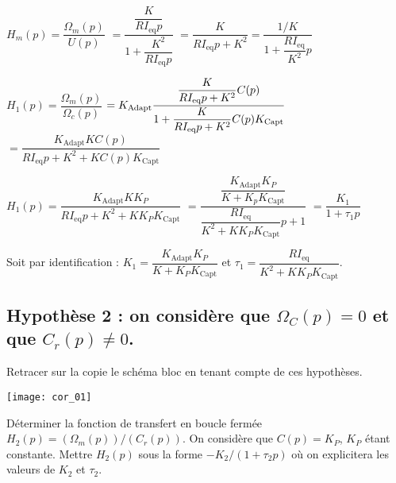 \ifprof
\begin{corrige}
$H_m (p)=\dfrac{\Omega_m (p)}{U(p)} $
$= \dfrac{\dfrac{K}{RI_{\text{eq}}p}}{1+\dfrac{K^2}{ RI_{\text{eq}}p}}$
$=\dfrac{K}{R I_{\text{eq}} p+K^2  }=\dfrac{1/K}{1+\dfrac{RI_{\text{eq}}}{K^2}p}$


$H_1 (p)=\dfrac{\Omega_m (p)}{\Omega_c (p)} $
$=K_{\text{Adapt}} \dfrac{\dfrac{K}{R I_{\text{eq}} p+K^2 } C(p)}{%
1+\dfrac{K}{R I_{\text{eq}} p+K^2 } C(p) K_{\text{Capt}} }$
$=\dfrac{K_{\text{Adapt}} K C(p)}{R I_{\text{eq}} p+K^2+K C(p) K_{\text{Capt}} }$


$H_1 (p)=\dfrac{K_{\text{Adapt}} K K_P}{R I_{\text{eq}} p+K^2+K K_P K_{\text{Capt}}}$
$=\dfrac{\dfrac{K_{\text{Adapt}} K_P}{K+K_p K_{\text{Capt}}}}{\dfrac{R I_{\text{eq}}}{K^2+K K_P K_{\text{Capt}}} p+1}$
$=\dfrac{K_1}{1+\tau_1 p}$


Soit par identification : $K_1=\dfrac{K_{\text{Adapt}} K_P}{K+K_P K_{\text{Capt}}}$	et	$\tau_1=\dfrac{R I_{\text{eq}}}{K^2+K K_P K_{\text{Capt}}}$.




\end{corrige}
\else

\fi






\subsection*{Hypothèse 2 : on considère que $\Omega_C (p)=0$ et que $C_r (p)\neq0$.}
\begin{question}
Retracer sur la copie le schéma bloc en tenant compte de ces hypothèses.
\end{question}

\ifprof
\begin{corrige}
\begin{center}
\texttt{[image: cor\_01]}
\end{center}
\end{corrige}
\else
\fi


\begin{question}
Déterminer la fonction de transfert en boucle fermée $H_2 (p)=(\Omega_m (p))/(C_r (p))$. On considère que $C(p)=K_P$, $K_P$ étant constante. Mettre $H_2 (p)$ sous la forme $-K_2/(1+\tau_2 p)$ où on explicitera les valeurs de $K_2$ et $\tau_2$.
\end{question}

